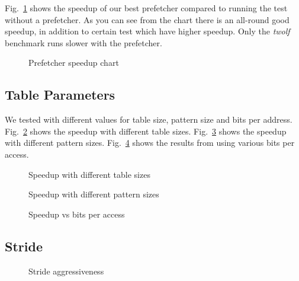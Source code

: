 Fig.~\ref{fig:prefetcher_speedup} shows the speedup of our best prefetcher
compared to running the test without a prefetcher. As you can see from the
chart there is an all-round good speedup, in addition to certain test which
have higher speedup. Only the \emph{twolf} benchmark runs slower with the
prefetcher.

\begin{figure}
	
	\caption{Prefetcher speedup chart}
	\label{fig:prefetcher_speedup}
\end{figure}

\subsection{Table Parameters}
We tested with different values for table size, pattern size and bits per address.
Fig.~\ref{fig:table_size_chart} shows the speedup with different table sizes.
Fig.~\ref{fig:pattern_size} shows the speedup with different pattern sizes.
Fig.~\ref{fig:bits} shows the results from using various bits per access.

\begin{figure}
	
	\caption{Speedup with different table sizes}
	\label{fig:table_size_chart}
\end{figure}

\begin{figure}
	
	\caption{Speedup with different pattern sizes}
	\label{fig:pattern_size}
\end{figure}

\begin{figure}
	
	\caption{Speedup vs bits per access}
	\label{fig:bits}
\end{figure}

\subsection{Stride}

\begin{figure}
	
	\caption{Stride aggressiveness}
	\label{fig:aggr}
\end{figure}

